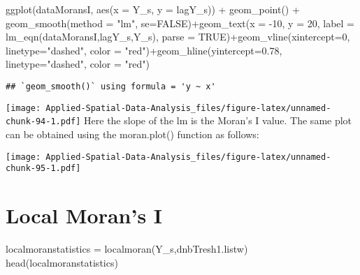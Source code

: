 \documentclass[
]{book}
\newenvironment{Shaded}{\begin{snugshade}}{\end{snugshade}}
\newcommand{\AttributeTok}[1]{\textcolor[rgb]{0.77,0.63,0.00}{#1}}
\newcommand{\ConstantTok}[1]{\textcolor[rgb]{0.00,0.00,0.00}{#1}}
\newcommand{\DecValTok}[1]{\textcolor[rgb]{0.00,0.00,0.81}{#1}}
\newcommand{\FloatTok}[1]{\textcolor[rgb]{0.00,0.00,0.81}{#1}}
\newcommand{\FunctionTok}[1]{\textcolor[rgb]{0.00,0.00,0.00}{#1}}
\newcommand{\NormalTok}[1]{#1}
\newcommand{\OtherTok}[1]{\textcolor[rgb]{0.56,0.35,0.01}{#1}}
\newcommand{\SpecialCharTok}[1]{\textcolor[rgb]{0.00,0.00,0.00}{#1}}
\newcommand{\StringTok}[1]{\textcolor[rgb]{0.31,0.60,0.02}{#1}}
\begin{document}
\begin{Shaded}
\begin{Highlighting}[]
\FunctionTok{ggplot}\NormalTok{(dataMoransI, }\FunctionTok{aes}\NormalTok{(}\AttributeTok{x =}\NormalTok{ Y\_s, }\AttributeTok{y =}\NormalTok{ lagY\_s)) }\SpecialCharTok{+} \FunctionTok{geom\_point}\NormalTok{() }\SpecialCharTok{+} \FunctionTok{geom\_smooth}\NormalTok{(}\AttributeTok{method =} \StringTok{"lm"}\NormalTok{, }\AttributeTok{se=}\ConstantTok{FALSE}\NormalTok{)}\SpecialCharTok{+}\FunctionTok{geom\_text}\NormalTok{(}\AttributeTok{x =} \SpecialCharTok{{-}}\DecValTok{10}\NormalTok{, }\AttributeTok{y =} \DecValTok{20}\NormalTok{, }\AttributeTok{label =} \FunctionTok{lm\_eqn}\NormalTok{(dataMoransI,lagY\_s,Y\_s), }\AttributeTok{parse =} \ConstantTok{TRUE}\NormalTok{)}\SpecialCharTok{+}\FunctionTok{geom\_vline}\NormalTok{(}\AttributeTok{xintercept=}\DecValTok{0}\NormalTok{, }\AttributeTok{linetype=}\StringTok{"dashed"}\NormalTok{, }\AttributeTok{color =} \StringTok{"red"}\NormalTok{)}\SpecialCharTok{+}\FunctionTok{geom\_hline}\NormalTok{(}\AttributeTok{yintercept=}\FloatTok{0.78}\NormalTok{, }\AttributeTok{linetype=}\StringTok{"dashed"}\NormalTok{, }\AttributeTok{color =} \StringTok{"red"}\NormalTok{)}
\end{Highlighting}
\end{Shaded}

\begin{verbatim}
## `geom_smooth()` using formula = 'y ~ x'
\end{verbatim}

\texttt{[image: Applied-Spatial-Data-Analysis\_files/figure-latex/unnamed-chunk-94-1.pdf]}
Here the slope of the lm is the Moran's I value. The same plot can be obtained using the moran.plot() function as follows:

\begin{Shaded}
\end{Shaded}

\texttt{[image: Applied-Spatial-Data-Analysis\_files/figure-latex/unnamed-chunk-95-1.pdf]}

\hypertarget{local-morans-i}{%
\section{Local Moran's I}\label{local-morans-i}}

\begin{Shaded}
\begin{Highlighting}[]
\NormalTok{localmoranstatistics }\OtherTok{=} \FunctionTok{localmoran}\NormalTok{(Y\_s,dnbTresh1.listw)}
\FunctionTok{head}\NormalTok{(localmoranstatistics)}
\end{Highlighting}
\end{Shaded}
\end{document}
